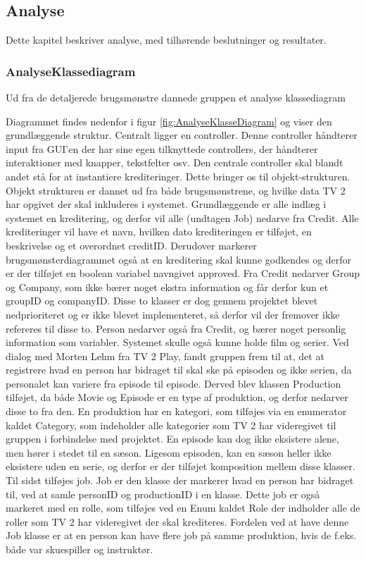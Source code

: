\hfuzz=100pt
\vfuzz=100pt
\subsection{Analyse}

Dette kapitel beskriver analyse, med tilhørende beslutninger og resultater.

\subsubsection{AnalyseKlassediagram} Ud fra de detaljerede brugsmønstre dannede gruppen et analyse klassediagram



Diagrammet findes nedenfor i figur \ref{fig:AnalyseKlasseDiagram} og viser den grundlæggende struktur. Centralt ligger en controller. Denne controller håndterer input fra GUI'en der har sine egen tilknyttede controllers, der håndterer interaktioner med knapper, tekstfelter osv. Den centrale controller skal blandt andet stå for at instantiere krediteringer. Dette bringer os til objekt-strukturen. Objekt strukturen er dannet ud fra både brugsmønstrene, og hvilke data TV 2 har opgivet der skal inkluderes i systemet. Grundlæggende er alle indlæg i systemet en kreditering, og derfor vil alle (undtagen Job) nedarve fra Credit. Alle krediteringer vil have et navn, hvilken dato krediteringen er tilføjet, en beskrivelse og et overordnet creditID. Derudover markerer brugsmønsterdiagrammet også at en kreditering skal kunne godkendes og derfor er der tilføjet en boolean variabel navngivet approved. Fra Credit nedarver Group og Company, som ikke bærer noget ekstra information og får derfor kun et groupID og companyID. Disse to klasser er dog gennem projektet blevet nedprioriteret og er ikke blevet implementeret, så derfor vil der fremover ikke refereres til disse to. Person nedarver også fra Credit, og bærer noget personlig information som variabler. Systemet skulle også kunne holde film og serier. Ved dialog med Morten Lehm fra TV 2 Play, fandt gruppen frem til at, det at registrere hvad en person har bidraget til skal ske på episoden og ikke serien, da personalet kan variere fra episode til episode. Derved blev klassen Production tilføjet, da både Movie og Episode er en type af produktion, og derfor nedarver disse to fra den. 
En produktion har en kategori, som tilføjes via en enumerator kaldet Category, som indeholder alle kategorier som TV 2 har videregivet til gruppen i forbindelse med projektet. En episode kan dog ikke eksistere alene, men hører i stedet til en sæson. Ligesom episoden, kan en sæson heller ikke eksistere uden en serie, og derfor er der tilføjet komposition mellem disse klasser. Til sidst tilføjes job. Job er den klasse der markerer hvad en person har bidraget til, ved at samle personID og productionID i en klasse. Dette job er også markeret med en rolle, som tilføjes ved en Enum kaldet Role der indholder alle de roller som TV 2 har videregivet der skal krediteres. Fordelen ved at have denne Job klasse er at en person kan have flere job på samme produktion, hvis de f.eks. både var skuespiller og instruktør.
